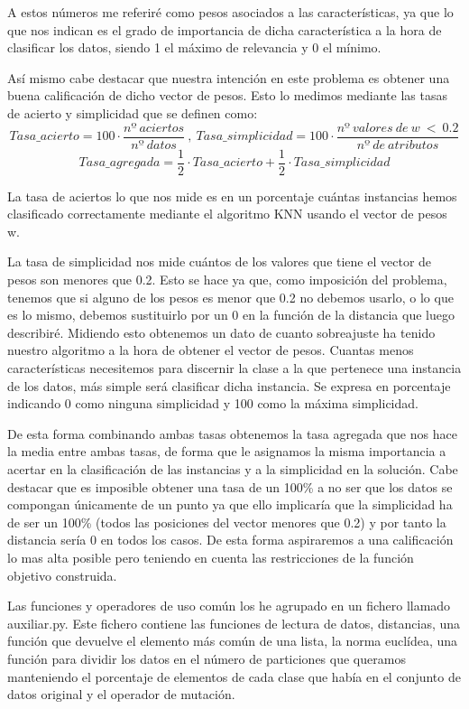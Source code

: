 \documentclass[12pt,a4paper]{article}
\begin{document}
	A estos números me referiré como pesos asociados a las características, ya que lo que nos indican es el grado de importancia de dicha característica a la hora de clasificar los datos, siendo 1 el máximo de relevancia y 0 el mínimo.

	Así mismo cabe destacar que nuestra intención en este problema es obtener una buena calificación de dicho vector de pesos. Esto lo medimos mediante las tasas de acierto y simplicidad que se definen como:
	$$Tasa\_acierto = 100\cdot \frac{nº  \ aciertos}{nº \ datos} \ , \ Tasa\_simplicidad = 100\cdot \frac{nº \ valores \ de \ w \ < \ 0.2}{nº \ de \ atributos}$$
	$$Tasa\_agregada = \frac{1}{2}\cdot Tasa\_acierto + \frac{1}{2}\cdot Tasa\_simplicidad$$

	La tasa de aciertos lo que nos mide es en un porcentaje cuántas instancias hemos clasificado correctamente mediante el algoritmo KNN usando el vector de pesos w.

	La tasa de simplicidad nos mide cuántos de los valores que tiene el vector de pesos son menores que 0.2. Esto se hace ya que, como imposición del problema, tenemos que si alguno de los pesos es menor que 0.2 no debemos usarlo, o lo que es lo mismo, debemos sustituirlo por un 0 en la función de la distancia que luego describiré. Midiendo esto obtenemos un dato de cuanto sobreajuste ha tenido nuestro algoritmo a la hora de obtener el vector de pesos. Cuantas menos características necesitemos para discernir la clase a la que pertenece una instancia de los datos, más simple será clasificar dicha instancia. Se expresa en porcentaje indicando 0 como ninguna simplicidad y 100 como la máxima simplicidad.

	De esta forma combinando ambas tasas obtenemos la tasa agregada que nos hace la media entre ambas tasas, de forma que le asignamos la misma importancia a acertar en la clasificación de las instancias y a la simplicidad en la solución. Cabe destacar que es imposible obtener una tasa de un 100\% a no ser que los datos se compongan únicamente de un punto ya que ello implicaría que la simplicidad ha de ser un 100\% (todos las posiciones del vector menores que 0.2) y por tanto la distancia sería 0 en todos los casos. De esta forma aspiraremos a una calificación lo mas alta posible pero teniendo en cuenta las restricciones de la función objetivo construida.

	Las funciones y operadores de uso común los he agrupado en un fichero llamado auxiliar.py. Este fichero contiene las funciones de lectura de datos, distancias, una función que devuelve el elemento más común de una lista, la norma euclídea, una función para dividir los datos en el número de particiones que queramos manteniendo el porcentaje de elementos de cada clase que había en el conjunto de datos original y el operador de mutación.
\end{document}
